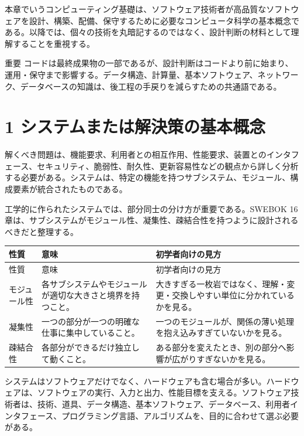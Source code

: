 \documentclass[a4paper,11pt]{ltjsarticle}
\begin{document}
本章でいうコンピューティング基礎は、ソフトウェア技術者が高品質なソフトウェアを設計、構築、配備、保守するために必要なコンピュータ科学の基本概念である。以降では、個々の技術を丸暗記するのではなく、設計判断の材料として理解することを重視する。

\begin{importantbox}{重要}
コードは最終成果物の一部であるが、設計判断はコードより前に始まり、運用・保守まで影響する。データ構造、計算量、基本ソフトウェア、ネットワーク、データベースの知識は、後工程の手戻りを減らすための共通語である。

\end{importantbox}

\section{1 システムまたは解決策の基本概念}

解くべき問題は、機能要求、利用者との相互作用、性能要求、装置とのインタフェース、セキュリティ、脆弱性、耐久性、更新容易性などの観点から詳しく分析する必要がある。システムは、特定の機能を持つサブシステム、モジュール、構成要素が統合されたものである。

工学的に作られたシステムでは、部分同士の分け方が重要である。SWEBOK 16章は、サブシステムがモジュール性、凝集性、疎結合性を持つように設計されるべきだと整理する。

\begin{longtable}{>{\raggedright\arraybackslash}p{}>{\raggedright\arraybackslash}p{}>{\raggedright\arraybackslash}p{}}
\toprule
性質 & 意味 & 初学者向けの見方 \\
\midrule
\endfirsthead
\toprule
性質 & 意味 & 初学者向けの見方 \\
\midrule
\endhead
モジュール性 & 各サブシステムやモジュールが適切な大きさと境界を持つこと。 & 大きすぎる一枚岩ではなく、理解・変更・交換しやすい単位に分かれているかを見る。 \\
凝集性 & 一つの部分が一つの明確な仕事に集中していること。 & 一つのモジュールが、関係の薄い処理を抱え込みすぎていないかを見る。 \\
疎結合性 & 各部分ができるだけ独立して動くこと。 & ある部分を変えたとき、別の部分へ影響が広がりすぎないかを見る。 \\
\bottomrule
\end{longtable}

システムはソフトウェアだけでなく、ハードウェアも含む場合が多い。ハードウェアは、ソフトウェアの実行、入力と出力、性能目標を支える。ソフトウェア技術者は、技術、道具、データ構造、基本ソフトウェア、データベース、利用者インタフェース、プログラミング言語、アルゴリズムを、目的に合わせて選ぶ必要がある。
\end{document}
